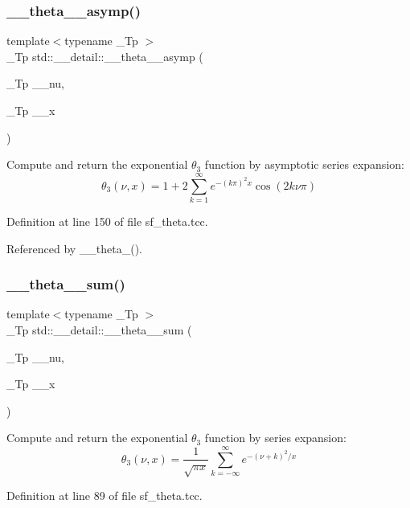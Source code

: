 \subsubsection{\texorpdfstring{\+\_\+\+\_\+theta\+\_\+\_\+asymp()}{\_\_theta\_3\_asymp()}}
{\footnotesize\ttfamily template$<$typename \+\_\+\+Tp $>$ \\
\+\_\+\+Tp std\+::\+\_\+\+\_\+detail\+::\+\_\+\+\_\+theta\+\_\+\_\+asymp (\begin{DoxyParamCaption}\item[{\+\_\+\+Tp}]{\+\_\+\+\_\+nu,  }\item[{\+\_\+\+Tp}]{\+\_\+\+\_\+x }\end{DoxyParamCaption})}

Compute and return the exponential $ \theta_3 $ function by asymptotic series expansion\+: \[ \theta_3(\nu, x) = 1 + 2\sum_{k=1}^{\infty} e^{-(k\pi)^2 x} \cos(2k\nu\pi) \] 

Definition at line 150 of file sf\+\_\+theta.\+tcc.



Referenced by \+\_\+\+\_\+theta\+\_().

\mbox{\label{namespacestd_1_1____detail_a3dc1b5188464b81b6acbb2983ef0f77c}} 
\subsubsection{\texorpdfstring{\+\_\+\+\_\+theta\+\_\+\_\+sum()}{\_\_theta\_3\_sum()}}
{\footnotesize\ttfamily template$<$typename \+\_\+\+Tp $>$ \\
\+\_\+\+Tp std\+::\+\_\+\+\_\+detail\+::\+\_\+\+\_\+theta\+\_\+\_\+sum (\begin{DoxyParamCaption}\item[{\+\_\+\+Tp}]{\+\_\+\+\_\+nu,  }\item[{\+\_\+\+Tp}]{\+\_\+\+\_\+x }\end{DoxyParamCaption})}

Compute and return the exponential $ \theta_3 $ function by series expansion\+: \[ \theta_3(\nu, x) = \frac{1}{\sqrt{\pi x}} \sum_{k=-\infty}^{\infty} e^{-(\nu+k)^2/x} \] 

Definition at line 89 of file sf\+\_\+theta.\+tcc.



